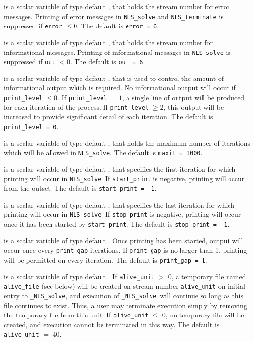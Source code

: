 \documentclass{galahad}
\newcommand{\packagename}{NLS}
\newcommand{\fullpackagename}{\libraryname\_\packagename}
\newcommand{\solver}{{\tt \fullpackagename\_solve}}
\begin{document}
\begin{description}

 is a scalar variable of type default \integer, that holds the
stream number for error messages. Printing of error messages in
{\tt \packagename\_solve} and {\tt \packagename\_terminate}
is suppressed if {\tt error} $\leq 0$.
The default is {\tt error = 6}.

 is a scalar variable of type default \integer, that holds the
stream number for informational messages. Printing of informational messages in
{\tt \packagename\_solve} is suppressed if {\tt out} $< 0$.
The default is {\tt out = 6}.

 is a scalar variable of type default \integer, that is used
to control the amount of informational output which is required. No
informational output will occur if {\tt print\_level} $\leq 0$. If
{\tt print\_level} $= 1$, a single line of output will be produced for each
iteration of the process. If {\tt print\_level} $\geq 2$, this output will be
increased to provide significant detail of each iteration.
The default is {\tt print\_level = 0}.

 is a scalar variable of type default \integer, that holds the
maximum number of iterations which will be allowed in {\tt \packagename\_solve}.
The default is {\tt maxit = 1000}.

 is a scalar variable of type default \integer, that specifies
the first iteration for which printing will occur in {\tt \packagename\_solve}.
If {\tt start\_print} is negative, printing will occur from the outset.
The default is {\tt start\_print = -1}.

 is a scalar variable of type default \integer, that specifies
the last iteration for which printing will occur in  {\tt \packagename\_solve}.
If {\tt stop\_print} is negative, printing will occur once it has been
started by {\tt start\_print}.
The default is {\tt stop\_print = -1}.

 is a scalar variable of type default \integer.
Once printing has been started, output will occur once every
{\tt print\_gap} iterations. If {\tt print\_gap} is no larger than 1,
printing will be permitted on every iteration.
The default is {\tt print\_gap = 1}.

 is a scalar variable of type default \integer.
If {\tt alive\_unit} $>$ 0, a temporary file named {\tt alive\_file} (see below)
will be created on stream number {\tt alive\_unit} on initial entry to
\solver, and execution of \solver\ will continue so
long as this file continues to exist. Thus, a user may terminate execution
simply by removing the temporary file from this unit.
If {\tt alive\_unit} $\leq$ 0, no temporary file will be created, and
execution cannot be terminated in this way.
The default is {\tt alive\_unit} $=$ 40.


\end{description}
\end{document}

